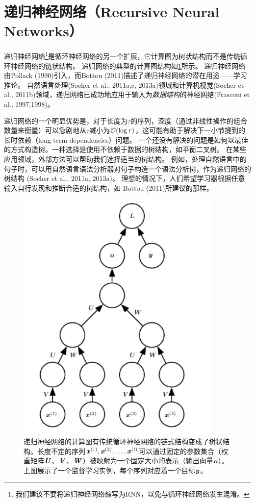 \section{递归神经网络（Recursive Neural Networks）}
\label{sec:10.6}
递归神经网络\footnote{我们建议不要将递归神经网络缩写为RNN，以免与循环神经网络发生混淆。}是循环神经网络的另一个扩展，它计算图为树状结构而不是传统循环神经网络的链状结构。
递归网络的典型的计算图结构如\ref{fig:10_14}所示。
递归神经网络由Pollack (1990)引入，而Bottou (2011)描述了递归神经网络的潜在用途——学习推论。
自然语言处理(Socher et al., 2011a,c, 2013a)领域和计算机视觉(Socher et al., 2011b)领域，递归网络已成功地应用于输入为\emph{数据结构}的神经网络(Frasconi et al., 1997,1998)。

递归网络的一个明显优势是，对于长度为$\tau$的序列，深度（通过非线性操作的组合数量来衡量）可以急剧地从$\tau$减小为$\mathcal{O}(\log \tau)$，这可能有助于解决下一小节提到的长时依赖（long-term dependencies）问题。
一个还没有解决的问题是如何以最佳的方式构造树。一种选择是使用不依赖于数据的树结构，如平衡二叉树。
在某些应用领域，外部方法可以帮助我们选择适当的树结构。
例如，处理自然语言中的句子时，可以用自然语言语法分析器对句子构造一个语法分析树，作为递归网络的树结构 (Socher et al., 2011a, 2013a)。
理想的情况下，人们希望学习器根据任意输入自行发现和推断合适的树结构，如 Bottou (2011)所建议的那样。
 
\begin{figure}[htbp] %
   \centering
   \includegraphics[width=4in]{fig/chap10/10_14.PNG} 
   \caption{递归神经网络的计算图有传统循环神经网络的链式结构变成了树状结构。长度不定的序列$\boldsymbol{\mathit{x}}^{(1)},\boldsymbol{\mathit{x}}^{(2)},\dots,\boldsymbol{\mathit{x}}^{(t)}$可以通过固定的参数集合（权重矩阵$\boldsymbol{\mathit{U}}$、$\boldsymbol{\mathit{V}}$、$\boldsymbol{\mathit{W}}$）被映射为一个固定大小的表示（输出向量$\boldsymbol{\mathit{o}}$）。上图展示了一个监督学习实例，每个序列对应着一个目标$\boldsymbol{\mathit{y}}$。}
   \label{fig:10_14}
\end{figure}
 
